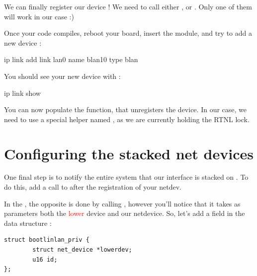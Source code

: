 We can finally register our device ! We need to call either , or . Only one of them will work in our case :)

Once your code compiles, reboot your board, insert the module, and try to add a new  device :

\begin{targetbashinput}
ip link add link lan0 name blan10 type blan
\end{targetbashinput}

You should see your new device with :

\begin{targetbashinput}
ip link show
\end{targetbashinput}

You can now populate the  function, that unregisters the device. In our case, we need to use
a special helper named , as we are currently holding the RTNL lock.

\section{Configuring the stacked net devices}

One final step is to notify the entire system that our  interface is stacked on \textcolor{red}{}. To do this, add a call to  after the registration of your netdev.

In the , the opposite is done by calling , however you'll notice that it takes as parameters both the \textcolor{red}{lower} device and our netdevice. So, let's add a  field in the  data structure :

\begin{verbatim}
struct bootlinlan_priv {
        struct net_device *lowerdev;
        u16 id;
};
\end{verbatim}

